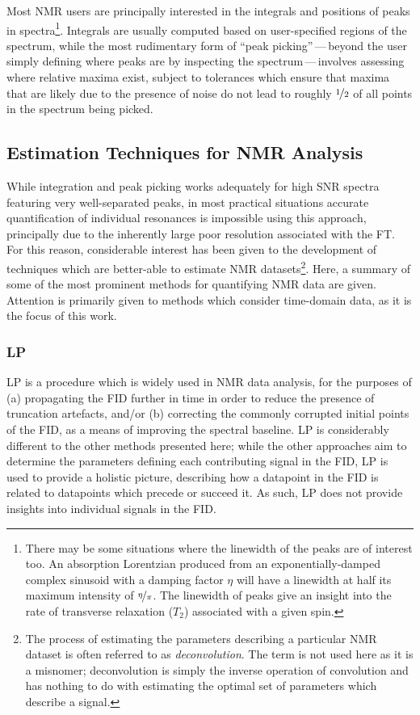 Most \ac{NMR} users are principally interested in the integrals and positions
of peaks in spectra\footnote{
    There may be some situations where the linewidth of the peaks are of
    interest too. An absorption Lorentzian produced from an
    exponentially-damped complex sinusoid with a damping factor $\eta$ will
    have a linewidth at half its maximum intensity of $\nicefrac{\eta}{\pi}$.
    The linewidth of peaks give an insight into the rate of transverse
    relaxation ($T_2$) associated with a given spin.
}.
Integrals are usually computed based on user-specified regions of the spectrum,
while the most rudimentary form of ``peak picking''\,---\,beyond the user
simply defining where peaks are by inspecting the spectrum\,---\,involves
assessing where relative maxima exist, subject to
tolerances which ensure that maxima that are likely due to the presence of
noise do not lead to roughly $\nicefrac{1}{2}$ of all points in the spectrum
being picked.

\subsection{Estimation Techniques for NMR Analysis}
\label{subsec:estimation-techniques}
While integration and peak picking works adequately for high \ac{SNR} spectra
featuring very well-separated peaks, in most practical situations accurate
quantification of individual resonances is impossible using this approach,
principally due to the inherently large poor resolution associated with the
\ac{FT}.
For this reason, considerable interest has been given to the development of
techniques which are better-able to estimate \ac{NMR} datasets\footnote{
    The process of estimating the parameters describing a particular \ac{NMR}
    dataset is often referred to as \emph{deconvolution}. The term is not used
    here as it is a misnomer; deconvolution is simply the inverse operation of
    convolution and has nothing to do with estimating the optimal set of
    parameters which describe a signal.
}.
Here, a summary of some of the most prominent methods for quantifying \ac{NMR}
data are given. Attention is primarily given to methods which consider
time-domain data, as it is the focus of this work.

\subsubsection{\Acl{LP}}
\Ac{LP}\cite{Stephenson1988,Koehl1999} is a procedure which is widely used
in \ac{NMR} data analysis, for the purposes of (a) propagating the
\ac{FID} further in time in order to reduce the presence of truncation
artefacts, and/or (b) correcting the commonly corrupted initial points of the
\ac{FID}, as a means of improving the spectral baseline. \ac{LP} is
considerably different to the other methods presented here; while the other
approaches aim to determine the parameters defining each contributing signal in
the \ac{FID}, \ac{LP} is used to provide a holistic picture, describing how a
datapoint in the \ac{FID} is related to datapoints which precede or succeed it.
As such, \ac{LP} does not provide insights into individual signals in the
\ac{FID}.


